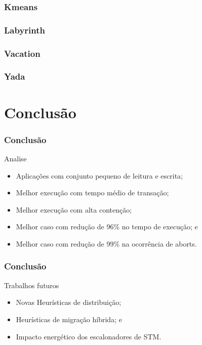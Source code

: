 \documentclass[10pt, pdf,xcolor=pdftex,dvipsnames,table]{beamer}
\begin{document}
\begin{frame} \frametitle{Kmeans}
    
\end{frame}

\begin{frame} \frametitle{Labyrinth}
    
\end{frame}

\begin{frame} \frametitle{Vacation}
    
\end{frame}

\begin{frame} \frametitle{Yada}
    
\end{frame}

%     

\section{Conclusão}
\begin{frame} \frametitle{Conclusão}
    \begin{block}{Analise}
        \begin{itemize}
        	\item Aplicações com conjunto pequeno de leitura e escrita;
        	\item Melhor execução com tempo médio de transação;
        	\item Melhor execução com alta contenção;
        	\item Melhor caso com redução de 96\% no tempo de execução; e
        	\item Melhor caso com redução de 99\% na ocorrência de aborts.
        \end{itemize}
    \end{block}
\end{frame}

\begin{frame} \frametitle{Conclusão}
    \begin{block}{Trabalhos futuros}
        \begin{itemize}
        	\item Novas Heurísticas de distribuição;
        	\item Heurísticas de migração híbrida; e
        	\item Impacto energético dos escalonadores de STM.
        \end{itemize}
    \end{block}
\end{frame}
\end{document}
